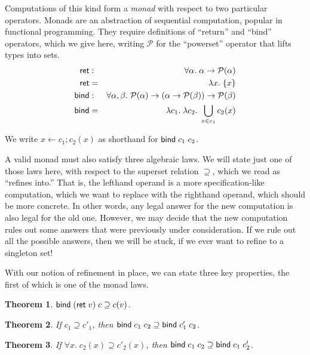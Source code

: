 \documentclass{amsbook}
\newtheorem{theorem}{Theorem}[chapter]
\theoremstyle{definition}
\theoremstyle{remark}
\numberwithin{section}{chapter}
\numberwithin{equation}{chapter}
\begin{document}
Computations of this kind form a \emph{monad} with respect to two particular operators.
Monads are an abstraction of sequential computation, popular in functional programming.
They require definitions of ``return'' and ``bind'' operators, which we give here, writing $\mathcal P$ for the ``powerset'' operator that lifts types into sets.
\begin{eqnarray*}
  \mathsf{ret} &:& \forall \alpha. \; \alpha \to \mathcal P(\alpha) \\
  \mathsf{ret} &=& \lambda x. \; \{x\} \\
  \mathsf{bind} &:& \forall \alpha, \beta. \; \mathcal P(\alpha) \to (\alpha \to \mathcal P(\beta)) \to \mathcal P(\beta) \\
  \mathsf{bind} &=& \lambda c_1. \; \lambda c_2. \; \bigcup_{x \in c_1} c_2(x)
\end{eqnarray*}

We write $x \leftarrow c_1; c_2(x)$ as shorthand for $\mathsf{bind} \; c_1 \; c_2$.

A valid monad must also satisfy three algebraic laws.
We will state just one of those laws here, with respect to the superset relation $\supseteq$, which we read as ``refines into.''
That is, the lefthand operand is a more specification-like computation, which we want to replace with the righthand operand, which should be more concrete.
In other words, any legal answer for the new computation is also legal for the old one.
However, we may decide that the new computation rules out some answers that were previously under consideration.
If we rule out all the possible answers, then we will be stuck, if we ever want to refine to a singleton set!

With our notion of refinement in place, we can state three key properties, the first of which is one of the monad laws.

\begin{theorem}\label{bindret}
  $\mathsf{bind} \; (\mathsf{ret} \; v) \; c \supseteq c(v)$.
\end{theorem}

\begin{theorem}\label{refine1}
  If $c_1 \supseteq c'_1$, then $\mathsf{bind} \; c_1 \; c_2 \supseteq \mathsf{bind} \; c'_1 \; c_2$.
\end{theorem}

\begin{theorem}\label{refine2}
  If $\forall x. \; c_2(x) \supseteq c'_2(x)$, then $\mathsf{bind} \; c_1 \; c_2 \supseteq \mathsf{bind} \; c_1 \; c'_2$.
\end{theorem}
\end{document}
